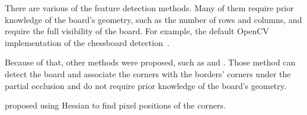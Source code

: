 There are various of the feature detection methods. Many of them require
prior knowledge of the board's geometry, such as the number of rows and columns,
and require the full visibility of the board. For example, the default OpenCV
implementation of the chessboard detection~\citep{OpenCVCameraCalibration}.

Because of that, other methods were proposed, such as
\cite{fuersattelOCPADOccludedCheckerboard2016} and
\cite{geigerAutomaticCameraRange2012}. Those method can detect the board and
associate the corners with the borders' corners under
the partial occlusion and do not require prior knowledge of the board's geometry.

\cite{chenNewSubPixelDetector2005} proposed using Hessian to find pixel
positions of the corners.
